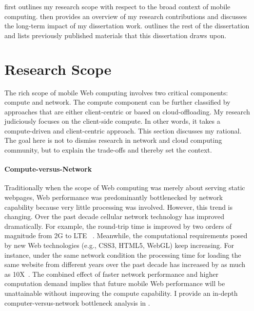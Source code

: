  first outlines my research scope with respect to the broad context of mobile computing.  then provides an overview of my research contributions and  discusses the long-term impact of my dissertation work.  outlines the rest of the dissertation and  lists previously published materials that this dissertation draws upon.

\section{Research Scope}
\label{sec:intro:scope}

The rich scope of mobile Web computing involves two critical components: compute and network. The compute component can be further classified by approaches that are either client-centric or based on cloud-offloading. My research judiciously focuses on the client-side compute. In other words, it takes a compute-driven and client-centric approach. This section discusses my rational. The goal here is not to dismiss research in network and cloud computing community, but to explain the trade-offs and thereby set the context.

\paragraph{Compute-versus-Network} Traditionally when the scope of Web computing was merely about serving static webpages, Web performance was predominantly bottlenecked by network capability because very little processing was involved. However, this trend is changing. Over the past decade cellular network technology has improved dramatically. For example, the round-trip time is improved by two orders of magnitude from 2G to LTE ~\cite{4gtest}. Meanwhile, the computational requirements posed by new Web technologies (e.g., CSS3, HTML5, WebGL) keep increasing. For instance, under the same network condition the processing time for loading the same website from different years over the past decade has increased by as much as 10X~\cite{big-little}. The combined effect of faster network performance and higher computation demand implies that future mobile Web performance will be unattainable without improving the compute capability. I provide an in-depth computer-versus-network bottleneck analysis in .

